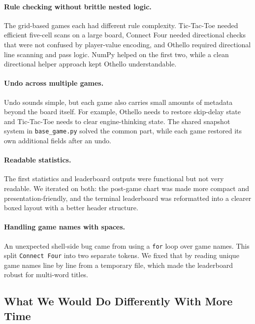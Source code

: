\documentclass[12pt,a4paper]{article}
\begin{document}
\paragraph{Rule checking without brittle nested logic.}
The grid-based games each had different rule complexity. Tic-Tac-Toe needed efficient five-cell scans on a large board, Connect Four needed directional checks that were not confused by player-value encoding, and Othello required directional line scanning and pass logic. NumPy helped on the first two, while a clean directional helper approach kept Othello understandable.

\paragraph{Undo across multiple games.}
Undo sounds simple, but each game also carries small amounts of metadata beyond the board itself. For example, Othello needs to restore skip-delay state and Tic-Tac-Toe needs to clear engine-thinking state. The shared snapshot system in \texttt{base\_game.py} solved the common part, while each game restored its own additional fields after an undo.

\paragraph{Readable statistics.}
The first statistics and leaderboard outputs were functional but not very readable. We iterated on both: the post-game chart was made more compact and presentation-friendly, and the terminal leaderboard was reformatted into a clearer boxed layout with a better header structure.

\paragraph{Handling game names with spaces.}
An unexpected shell-side bug came from using a \texttt{for} loop over game names. This split \texttt{Connect Four} into two separate tokens. We fixed that by reading unique game names line by line from a temporary file, which made the leaderboard robust for multi-word titles.

\subsection{What We Would Do Differently With More Time}
\end{document}
